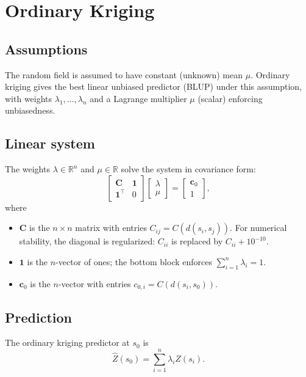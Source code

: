 \documentclass[11pt]{article}
\begin{document}
\section{Ordinary Kriging}

\subsection{Assumptions}
The random field is assumed to have constant (unknown) mean $\mu$. Ordinary kriging gives the best linear unbiased predictor (BLUP) under this assumption, with weights $\lambda_1, \ldots, \lambda_n$ and a Lagrange multiplier $\mu$ (scalar) enforcing unbiasedness.

\subsection{Linear system}
The weights $\lambda \in \mathbb{R}^n$ and $\mu \in \mathbb{R}$ solve the system in covariance form:
\begin{equation}
  \begin{bmatrix}
    \mathbf{C} & \mathbf{1} \\
    \mathbf{1}^\top & 0
  \end{bmatrix}
  \begin{bmatrix}
    \lambda \\ \mu
  \end{bmatrix}
  =
  \begin{bmatrix}
    \mathbf{c}_0 \\ 1
  \end{bmatrix},
\end{equation}
where
\begin{itemize}
  \item $\mathbf{C}$ is the $n \times n$ matrix with entries $C_{ij} = C(d(s_i, s_j))$. For numerical stability, the diagonal is regularized: $C_{ii}$ is replaced by $C_{ii} + 10^{-10}$.
  \item $\mathbf{1}$ is the $n$-vector of ones; the bottom block enforces $\sum_{i=1}^n \lambda_i = 1$.
  \item $\mathbf{c}_0$ is the $n$-vector with entries $c_{0,i} = C(d(s_i, s_0))$.
\end{itemize}

\subsection{Prediction}
The ordinary kriging predictor at $s_0$ is
\begin{equation}
  \hat{Z}(s_0) = \sum_{i=1}^n \lambda_i Z(s_i).
\end{equation}
\end{document}
